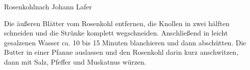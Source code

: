 \begin{recipe}{Rosenkohl}{nach Johann Lafer}
  \inglist

  \steps
  Die äußeren Blätter vom Rosenkohl entfernen, die Knollen in zwei hälften schneiden und
  die Strünke komplett wegschneiden. Anschließend in leicht gesalzenen Wasser ca. 10 bis
  15 Minuten blanchieren und dann abschütten. Die Butter in einer Pfanne auslassen und den
  Rosenkohl darin kurz anschwitzen, dann mit Salz, Pfeffer und Muskatnus würzen.
\end{recipe}
